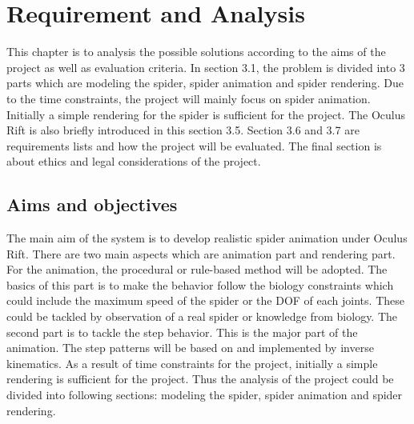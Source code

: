 \chapter{Requirement and Analysis}
This chapter is to analysis the possible solutions according to the aims of the project as well as evaluation criteria. In section 3.1, the problem is divided into 3 parts which are modeling the spider, spider animation and spider rendering. Due to the time constraints, the project will mainly focus on spider animation. Initially a simple rendering for the spider is sufficient for the project. The Oculus Rift is also briefly introduced in this section 3.5. Section 3.6 and 3.7 are requirements lists and how the project will be evaluated. The final section is about ethics and legal considerations of the project.
\section{Aims and objectives}
The main aim of the system is to develop realistic spider animation under Oculus Rift. There are two main aspects which are animation part and rendering part. For the animation, the procedural or rule-based method will be adopted. The basics of this part is to make the behavior follow the biology constraints which could include the maximum speed of the spider or the DOF of each joints. These could be tackled by observation of a real spider or knowledge from biology. The second part is to tackle the step behavior. This is the major part of the animation. The step patterns will be based on \cite{arsimu2} and implemented by inverse kinematics\cite{alan3D}. As a result of time constraints for the project, initially a simple rendering is sufficient for the project. Thus the analysis of the project could be divided into following sections: modeling the spider, spider animation and spider rendering.
